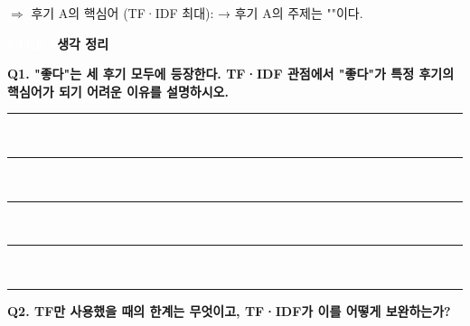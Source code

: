 \documentclass[a4paper,11pt]{article}
\newcommand{\essaybox}[1][5]{%
  \vspace{2mm}
  \noindent\rule{\linewidth}{0.3pt}\\[-2.5mm]
  \rule{\linewidth}{0.3pt}\\[-2.5mm]
  \rule{\linewidth}{0.3pt}\\[-2.5mm]
  \rule{\linewidth}{0.3pt}\\[-2.5mm]
  \rule{\linewidth}{0.3pt}
  \par\vspace{2mm}}
\begin{document}
\noindent\small $\Rightarrow$ 후기 A의 핵심어 (TF·IDF 최대): \hspace{25mm}   →   후기 A의 주제는 "\hspace{25mm}"이다.
\par
\par\vspace{3mm}
\noindent
\colorbox{badgegray}{\textcolor{white}{\small\bfseries STEP 5}}\enspace\textbf{생각 정리}
\par\vspace{1mm}
\noindent\textbf{Q1. "좋다"는 세 후기 모두에 등장한다. TF·IDF 관점에서 "좋다"가 특정 후기의 핵심어가 되기 어려운 이유를 설명하시오.}

\essaybox
\vspace{2mm}
\noindent\textbf{Q2. TF만 사용했을 때의 한계는 무엇이고, TF·IDF가 이를 어떻게 보완하는가?}
\end{document}
